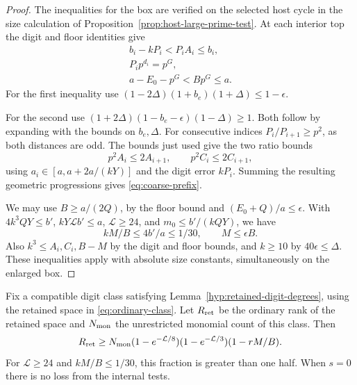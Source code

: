 \begin{proof}
The inequalities for the box are verified on the selected host cycle in the size calculation of Proposition~\ref{prop:host-large-prime-test}. At each interior top the digit and floor identities give \[
 \begin{gathered}
 b_i-kP_i<P_i A_i\le b_i, \\ P_i p^{d_i}=p^G, \\ a-E_0-p^G<Bp^G\le a.
\end{gathered}
\] For the first inequality use
\((1-2\Delta)(1+b_e)(1+\Delta)\le1-\epsilon\).

For the second use
\((1+2\Delta)(1-b_e-\epsilon)(1-\Delta)\ge1\).
Both follow by expanding with the bounds on \(b_e,\Delta\).
For consecutive indices \(P_i/P_{i+1}\ge p^2\), as both
distances are odd. The bounds just used give
the two ratio bounds
\[
       p^2A_i\le2A_{i+1},\qquad p^2C_i\le2C_{i+1},
\]
using \(a_i\in[a,a+2a/(kY)]\) and the digit error \(kP_i\). Summing the resulting geometric progressions gives \eqref{eq:coarse-prefix}.

We may use \(B\ge a/(2Q)\), by the floor bound and
\((E_0+Q)/a\le\epsilon\). With \(4 k^3 QY\le b'\),
\(kY\mathcal L b'\le a\), \(\mathcal L\ge24\), and
\(m_0\le b'/(kQY)\), we have
\[
 kM/B\le4b'/a\le1/30,\qquad M\le\epsilon B.
\]
Also \(k^3\le A_i,C_i,B-M\) by the digit and floor bounds,
and \(k\ge10\) by \(40\epsilon\le\Delta\). These inequalities
apply with absolute size constants, simultaneously on the
enlarged box.
\end{proof}

\begin{proposition}\label{prop:retained-digit-rank}
Fix a compatible digit class satisfying
Lemma~\ref{hyp:retained-digit-degrees}, using the retained space
in \eqref{eq:ordinary-class}.
Let \(R_{\rm ret}\) be the ordinary rank of the retained space
and \(N_{\rm mon}\) the unrestricted monomial count of this class. Then
\[
 R_{\rm ret}\ge N_{\rm mon}
 (1-e^{-\mathcal L/8})(1-e^{-\mathcal L/3})(1-rM/B).
\]
For \(\mathcal L\ge24\) and \(kM/B\le1/30\), this fraction
is greater than one half. When \(s=0\) there is no loss
from the internal tests.
\end{proposition}

